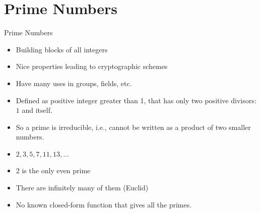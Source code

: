 \documentclass[ %
 usenames,dvipsnames,
aspectratio=169,11pt ]{beamer}
\newenvironment{stepitemize}{\begin{itemize}[<+->]}{\end{itemize} }
\begin{document}
\section{Prime Numbers}
\begin{frame}{Prime Numbers}
    \begin{stepitemize}
        \item Building blocks of all integers
        \item Nice properties leading to cryptographic schemes
        \item Have many uses in groups, fields, etc.
        \item Defined as positive integer greater than 1, that has only two positive divisors: $1$ and itself.
        \item So a prime is irreducible, i.e., cannot be written as a product of two smaller numbers.
        \item $2,3,5,7,11,13, \dots$
        \item $2$ is the only even prime
        \item There are infinitely many of them (Euclid)
        \item No known closed-form function that gives all the primes.
    \end{stepitemize}
\end{frame}
\end{document}
